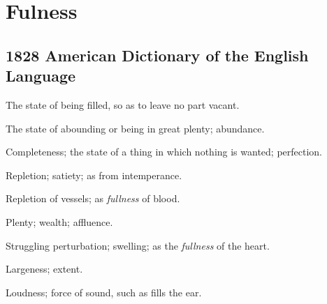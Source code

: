 \section{Fulness}
	\label{FULNESS}
	

\subsection{1828 American Dictionary of the English Language} %
	\label{FULNESS-1828}

	\begin{compactitem}
		\item[1] The state of being filled, so as to leave no part vacant.
		\item[2] The state of abounding or being in great plenty; abundance.
		\item[3] Completeness; the state of a thing in which nothing is wanted; perfection.
		\item[4] Repletion; satiety; as from intemperance.
		\item[5] Repletion of vessels; as \textit{fullness} of blood.
		\item[6] Plenty; wealth; affluence.
		\item[7] Struggling perturbation; swelling; as the \textit{fullness} of the heart.
		\item[8] Largeness; extent.
		\item[9] Loudness; force of sound, such as fills the ear.
	\end{compactitem}


	
